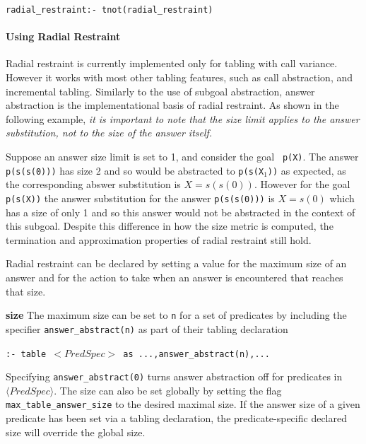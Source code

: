 {\tt radial\_restraint:- tnot(radial\_restraint)}


\paragraph*{Using Radial Restraint}
%
Radial restraint is currently implemented only for tabling with call
variance.  However it works with most other tabling features, such as
call abstraction, and incremental tabling.
%
Similarly to the use of subgoal abstraction, answer abstraction is the
implementational basis of radial restraint.  As shown in the following
example, {\em it is important to note that the size limit applies to
  the answer substitution, not to the size of the answer itself.}

\begin{example}
Suppose an answer size limit is set to 1, and consider the goal {\tt
  p(X)}.  The answer {\tt p(s(s(0)))} has size 2 and so would be
abstracted to {\tt p(s(X$_1$))} as expected, as the corresponding
abswer substitution is $X = s(s(0))$.  However for the goal {\tt
  p(s(X))} the answer substitution for the answer {\tt p(s(s(0)))} is
$X = s(0)$ which has a size of only 1 and so this answer would not be
abstracted in the context of this subgoal.  Despite this difference in
how the size metric is computed, the termination and approximation
properties of radial restraint still hold.
\end{example}

Radial restraint can be declared by setting a value for the maximum
size of an answer and for the action to take when an answer is
encountered that reaches that size.
%
\bi
\item {\bf size} The maximum size can be set to {\tt n} for a set of
  predicates by including the specifier {\tt answer\_abstract(n)} as
  part of their tabling declaration

{\tt :- table $<PredSpec>$ as ...,answer\_abstract(n),...}

  Specifying {\tt answer\_abstract(0)} turns answer abstraction off
  for predicates in $\langle PredSpec \rangle$.  The size can also be
  set globally by setting the flag {\tt max\_table\_answer\_size} to
  the desired maximal size.  If the answer size of a given predicate
  has been set via a tabling declaration, the predicate-specific
  declared size will override the global size.

